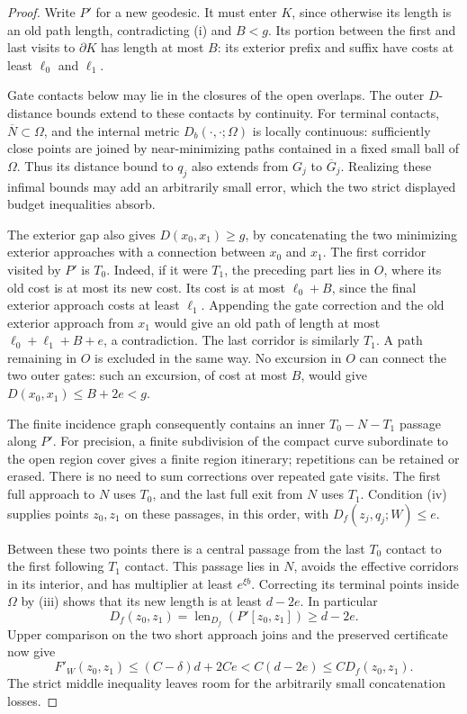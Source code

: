 \begin{proof}
Write $P'$ for a new geodesic.  It must enter $K$, since otherwise
its length is an old path length, contradicting (i) and $B<g$.
Its portion between the first and last visits to $\partial K$ has
length at most $B$: its exterior prefix and suffix have costs at
least $\ell_0$ and $\ell_1$.

Gate contacts below may lie in the closures of the open overlaps.
The outer $D$-distance bounds extend to these contacts by continuity.
For terminal contacts, $\overline N\subset\Omega$, and the internal
metric $D_b(\cdot,\cdot;\Omega)$ is locally continuous: sufficiently
close points are joined by near-minimizing paths contained in a fixed
small ball of $\Omega$.  Thus its distance bound to $q_j$ also extends
from $G_j$ to $\overline G_j$.  Realizing these infimal bounds may add
an arbitrarily small error, which the two strict displayed budget
inequalities absorb.

The exterior gap also gives $D(x_0,x_1)\ge g$, by concatenating
the two minimizing exterior approaches with a connection between
$x_0$ and $x_1$.  The first corridor visited by $P'$ is $T_0$.
Indeed, if it were $T_1$, the preceding part lies in $O$, where
its old cost is at most its new cost.  Its cost is at most
$\ell_0+B$, since the final exterior approach costs at least
$\ell_1$.  Appending the gate correction and the old exterior
approach from $x_1$ would give an old path of length at most
$\ell_0+\ell_1+B+e$, a contradiction.  The last corridor is
similarly $T_1$.  A path remaining in $O$ is excluded in the same
way.  No excursion in $O$ can connect the two outer gates:
such an excursion, of cost at most $B$, would give
$D(x_0,x_1)\le B+2e<g$.

The finite incidence graph consequently contains an inner
$T_0-N-T_1$ passage along $P'$.  For precision, a finite subdivision
of the compact curve subordinate to the open region cover gives
a finite region itinerary; repetitions can be retained or erased.
There is no need to sum corrections over repeated gate visits.
The first full approach to $N$ uses $T_0$, and the last full exit
from $N$ uses $T_1$.  Condition (iv) supplies points $z_0,z_1$ on
these passages, in this order, with
$D_f(z_j,q_j;W)\le e$.

Between these two points there is a central passage from the last
$T_0$ contact to the first following $T_1$ contact.  This passage
lies in $N$, avoids the effective corridors in its interior, and
has multiplier at least $e^{\xi b}$.  Correcting its terminal
points inside $\Omega$ by (iii) shows that its new length is at
least $d-2e$.  In particular
\[
 D_f(z_0,z_1)=\operatorname{len}_{D_f}(P'[z_0,z_1])\ge d-2e.
\]
Upper comparison on the two short approach joins and the
preserved certificate now give
\[
 F'_W(z_0,z_1)
 \le (C-\delta)d+2Ce
 <C(d-2e)
 \le C D_f(z_0,z_1).
\]
The strict middle inequality leaves room for the arbitrarily
small concatenation losses.
\end{proof}

